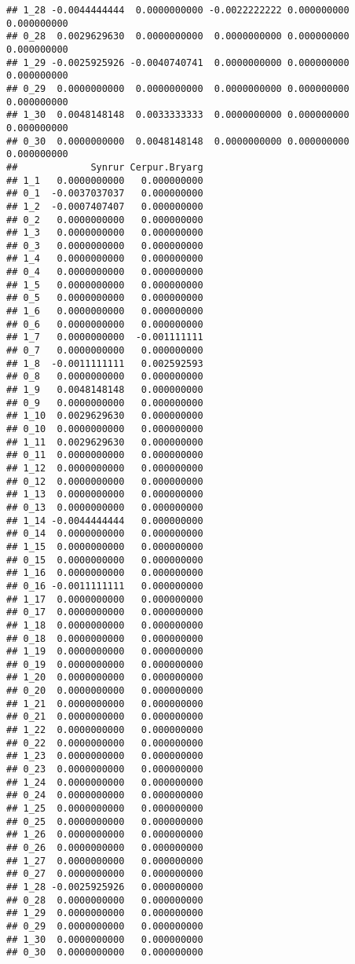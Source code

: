 \documentclass[]{article}
\begin{document}
\begin{verbatim}
## 1_28 -0.0044444444  0.0000000000 -0.0022222222 0.000000000  0.000000000
## 0_28  0.0029629630  0.0000000000  0.0000000000 0.000000000  0.000000000
## 1_29 -0.0025925926 -0.0040740741  0.0000000000 0.000000000  0.000000000
## 0_29  0.0000000000  0.0000000000  0.0000000000 0.000000000  0.000000000
## 1_30  0.0048148148  0.0033333333  0.0000000000 0.000000000  0.000000000
## 0_30  0.0000000000  0.0048148148  0.0000000000 0.000000000  0.000000000
##             Synrur Cerpur.Bryarg
## 1_1   0.0000000000   0.000000000
## 0_1  -0.0037037037   0.000000000
## 1_2  -0.0007407407   0.000000000
## 0_2   0.0000000000   0.000000000
## 1_3   0.0000000000   0.000000000
## 0_3   0.0000000000   0.000000000
## 1_4   0.0000000000   0.000000000
## 0_4   0.0000000000   0.000000000
## 1_5   0.0000000000   0.000000000
## 0_5   0.0000000000   0.000000000
## 1_6   0.0000000000   0.000000000
## 0_6   0.0000000000   0.000000000
## 1_7   0.0000000000  -0.001111111
## 0_7   0.0000000000   0.000000000
## 1_8  -0.0011111111   0.002592593
## 0_8   0.0000000000   0.000000000
## 1_9   0.0048148148   0.000000000
## 0_9   0.0000000000   0.000000000
## 1_10  0.0029629630   0.000000000
## 0_10  0.0000000000   0.000000000
## 1_11  0.0029629630   0.000000000
## 0_11  0.0000000000   0.000000000
## 1_12  0.0000000000   0.000000000
## 0_12  0.0000000000   0.000000000
## 1_13  0.0000000000   0.000000000
## 0_13  0.0000000000   0.000000000
## 1_14 -0.0044444444   0.000000000
## 0_14  0.0000000000   0.000000000
## 1_15  0.0000000000   0.000000000
## 0_15  0.0000000000   0.000000000
## 1_16  0.0000000000   0.000000000
## 0_16 -0.0011111111   0.000000000
## 1_17  0.0000000000   0.000000000
## 0_17  0.0000000000   0.000000000
## 1_18  0.0000000000   0.000000000
## 0_18  0.0000000000   0.000000000
## 1_19  0.0000000000   0.000000000
## 0_19  0.0000000000   0.000000000
## 1_20  0.0000000000   0.000000000
## 0_20  0.0000000000   0.000000000
## 1_21  0.0000000000   0.000000000
## 0_21  0.0000000000   0.000000000
## 1_22  0.0000000000   0.000000000
## 0_22  0.0000000000   0.000000000
## 1_23  0.0000000000   0.000000000
## 0_23  0.0000000000   0.000000000
## 1_24  0.0000000000   0.000000000
## 0_24  0.0000000000   0.000000000
## 1_25  0.0000000000   0.000000000
## 0_25  0.0000000000   0.000000000
## 1_26  0.0000000000   0.000000000
## 0_26  0.0000000000   0.000000000
## 1_27  0.0000000000   0.000000000
## 0_27  0.0000000000   0.000000000
## 1_28 -0.0025925926   0.000000000
## 0_28  0.0000000000   0.000000000
## 1_29  0.0000000000   0.000000000
## 0_29  0.0000000000   0.000000000
## 1_30  0.0000000000   0.000000000
## 0_30  0.0000000000   0.000000000
\end{verbatim}
\end{document}
